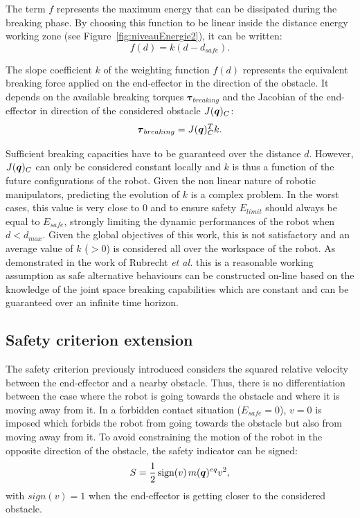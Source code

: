 \documentclass[a4paper, 10pt, conference]{ieeeconf}      %
\newcommand{\vect}[1]{\mbox{\boldmath${#1}$}}%
\begin{document}
The term $f$ represents the maximum energy that can be dissipated during the breaking phase. By choosing this function to be linear inside the distance energy working zone (see Figure~\ref{fig:niveauEnergie2}), it can be written:
\begin{equation}
f(d) = k (d - d_{safe}).
\end{equation}

The slope coefficient $k$ of the weighting function $f(d)$ represents the equivalent breaking force applied on the end-effector  in the direction of the obstacle. It depends on the available breaking torques $\boldsymbol{\tau}_{breaking}$ and the Jacobian of the end-effector in direction of the considered obstacle $J(\vect{q})_C$: 
\begin{equation}
\boldsymbol{\tau}_{breaking}  = J(\vect{q})_C^{T} k.
\end{equation}

Sufficient breaking capacities have to be guaranteed over the distance $d$. However, $J(\vect{q})_C$ can only be considered constant locally and $k$ is thus a function of the future configurations of the robot. Given the non linear nature of robotic manipulators, predicting the evolution of $k$ is a complex problem. In the worst cases, this value is very close to $0$ and to ensure safety $E_{limit}$  should always be equal to $E_{safe}$, strongly limiting the dynamic performances of the robot when $d < d_{max}$. Given the global objectives of this work, this is not satisfactory and an average value of $k$ ($>0$) is considered all over the workspace of the robot. As demonstrated in the work of Rubrecht \textit{et al.} \cite{rubrecht-AutonomousRobots2012} this is a reasonable working assumption as safe alternative behaviours can be constructed on-line based on the knowledge of the joint space breaking capabilities which are constant and can be guaranteed over an infinite time horizon. 

\subsection{Safety criterion extension}
The safety criterion previously introduced considers the squared relative velocity between the end-effector and a nearby obstacle. Thus, there is no differentiation between the case where the robot is going towards the obstacle and where it is moving away from it. In a forbidden contact situation ($E_{safe} = 0$), $v = 0$ is imposed which forbids the robot from going towards the obstacle but also from moving away from it. To avoid constraining the motion of the robot in the opposite direction of the obstacle, the safety indicator can be signed:
\begin{equation}
S = \frac{1}{2} \hspace{0.5mm} \textnormal{sign(} v \textnormal{)} \hspace{0.5mm} m(\vect{q})^{eq} v^2,
\label{eq:S_2}
\end{equation}
with $sign(v) = 1$ when the end-effector  is getting closer to the considered obstacle. 
\end{document}
